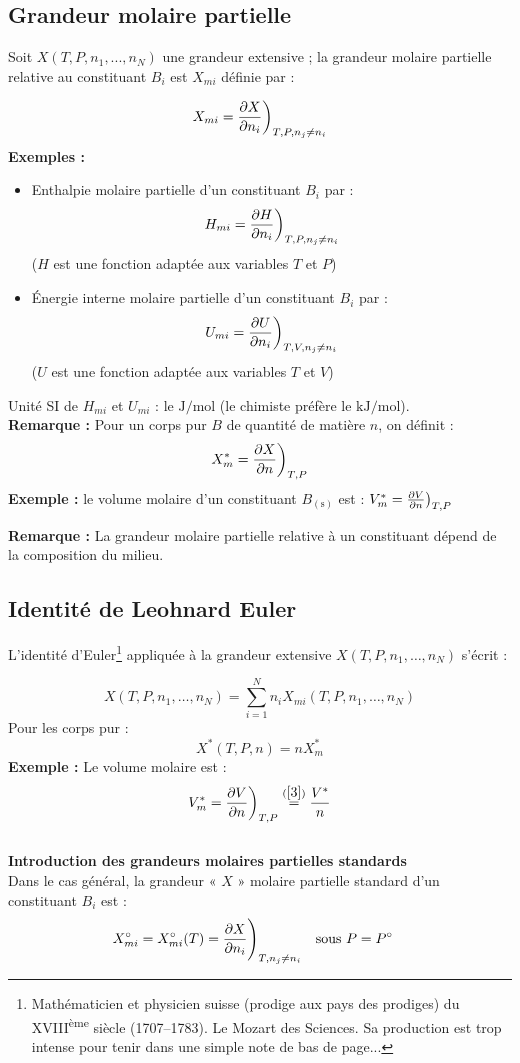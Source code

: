 \documentclass{article}
\let\oldref\ref
\renewcommand{\ref}[1]{(\oldref{#1})}
\newcommand{\ds}{\displaystyle}
\begin{document}
\subsection{Grandeur molaire partielle}
Soit $X(T,P,n_1, . . . ,n_N)$ une grandeur extensive ; la grandeur molaire partielle relative au constituant $B_i$ est $X_{mi}$ définie par :
\begin{tableau}
$$X_{mi}=\pdv{X}{n_i}\bigg)_{T,P,n_j\neq n_i}$$
    \textbf{Exemples :}
\begin{itemize}
    \item Enthalpie molaire partielle d'un constituant $B_i$ par :
    $$H_{mi}=\pdv{H}{n_i}\bigg)_{T,P,n_j\neq n_i}$$
    ($H$ est une fonction adaptée aux variables $T$ et $P$)
    \item Énergie interne molaire partielle d'un constituant $B_i$ par :
    $$U_{mi}=\pdv{U}{n_i}\bigg)_{T,V,n_j\neq n_i}$$
    ($U$ est une fonction adaptée aux variables $T$ et $V$)
\end{itemize}
Unité SI de $H_{mi}$ et $U_{mi}$ : le $\si{\joule\per\mole}$ (le chimiste préfère le $\si{\kilo\joule\per\mole}$).\\

\textbf{Remarque :} Pour un corps pur\footnotemark{} $B$ de quantité de matière $n$, on définit :
$$X_m^* = \pdv{X}{n}\bigg)_{T,P}$$
\textbf{Exemple :} le volume molaire d'un constituant $B_{\mathrm{(s)}}$ est : $V_m^* =\pdv{V}{n}\big)_{T,P}$
\end{tableau}
\textbf{Remarque :} La grandeur molaire partielle relative à un constituant dépend de la composition du milieu.

\subsection{Identité de Leohnard Euler}
L’identité d’Euler\footnote{Mathématicien et physicien suisse (prodige aux pays des prodiges) du XVIII\textsuperscript{ème} siècle (1707--1783). Le Mozart des Sciences. Sa production est trop intense pour tenir dans une simple note de bas de page...} appliquée à la grandeur extensive $X(T,P,n_1,\dots,n_N)$ s’écrit :
\begin{tableau}
    $$X(T,P,n_1,\dots,n_N) = \sum_{i=1}^N n_i X_{mi}(T,P,n_1,\dots,n_N)$$
    Pour les corps pur : 
    \begin{equation}\label{3}
        X^*(T,P,n) = nX^*_m
    \end{equation}
    \textbf{Exemple :} Le volume molaire est :
    $$\ds V_m^* =\pdv{V}{n}\bigg)_{T,P}\overset{\ref{3}}{=} \frac{V^*}{n}$$\\
    
    \textbf{Introduction des grandeurs molaires partielles standards}\\
    Dans le cas général, la grandeur « $X$ » molaire partielle standard d'un constituant $B_i$ est :
    $$X_{mi}^\circ = X_{mi}^\circ(T) = \pdv{X}{n_i}\Bigg)_{T,n_j\neq n_i}\qq{sous $P=P^\circ$}$$
\end{tableau}
\end{document}
